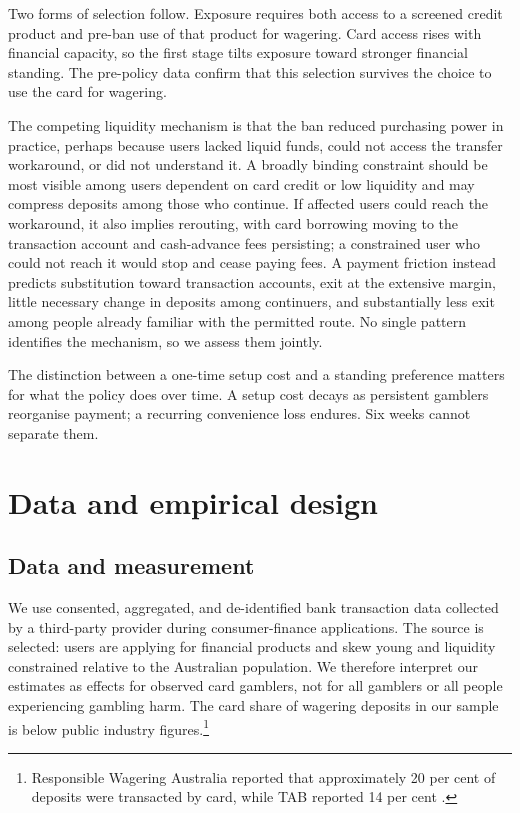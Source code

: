 \documentclass[12pt]{article}
\begin{document}
Two forms of selection follow. Exposure requires both access to a screened credit product and pre-ban use of that product for wagering. Card access rises with financial capacity, so the first stage tilts exposure toward stronger financial standing. The pre-policy data confirm that this selection survives the choice to use the card for wagering.

The competing liquidity mechanism is that the ban reduced purchasing power in practice, perhaps because users lacked liquid funds, could not access the transfer workaround, or did not understand it. A broadly binding constraint should be most visible among users dependent on card credit or low liquidity and may compress deposits among those who continue. If affected users could reach the workaround, it also implies rerouting, with card borrowing moving to the transaction account and cash-advance fees persisting; a constrained user who could not reach it would stop and cease paying fees. A payment friction instead predicts substitution toward transaction accounts, exit at the extensive margin, little necessary change in deposits among continuers, and substantially less exit among people already familiar with the permitted route. No single pattern identifies the mechanism, so we assess them jointly.

The distinction between a one-time setup cost and a standing preference matters for what the policy does over time. A setup cost decays as persistent gamblers reorganise payment; a recurring convenience loss endures. Six weeks cannot separate them.

\section{Data and empirical design}\label{sec:design}

\subsection{Data and measurement}

We use consented, aggregated, and de-identified bank transaction data collected by a third-party provider during consumer-finance applications. The source is selected: users are applying for financial products and skew young and liquidity constrained relative to the Australian population. We therefore interpret our estimates as effects for observed card gamblers, not for all gamblers or all people experiencing gambling harm. The card share of wagering deposits in our sample is below public industry figures.\footnote{Responsible Wagering Australia reported that approximately 20 per cent of deposits were transacted by card, while TAB reported 14 per cent \citep{AustralianBankingAssociation2020UseCreditCardsGambling,RegulationUseFinancialServicesOnlineGamblingAus}.}
\end{document}
